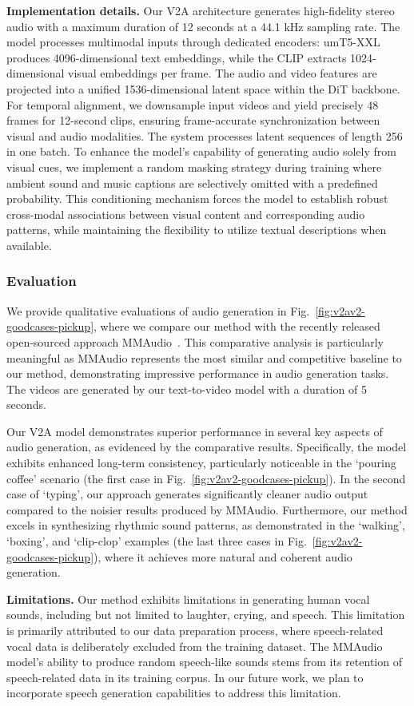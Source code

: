 \textbf{Implementation details.} Our V2A architecture generates high-fidelity stereo audio with a maximum duration of 12 seconds at a 44.1 kHz sampling rate. The model processes multimodal inputs through dedicated encoders: umT5-XXL produces 4096-dimensional text embeddings, while the CLIP extracts 1024-dimensional visual embeddings per frame. The audio and video features are projected into a unified 1536-dimensional latent space within the DiT backbone. For temporal alignment, we downsample input videos and yield precisely 48 frames for 12-second clips, ensuring frame-accurate synchronization between visual and audio modalities. The system processes latent sequences of length 256 in one batch. To enhance the model's capability of generating audio solely from visual cues, we implement a random masking strategy during training where ambient sound and music captions are selectively omitted with a predefined probability. This conditioning mechanism forces the model to establish robust cross-modal associations between visual content and corresponding audio patterns, while maintaining the flexibility to utilize textual descriptions when available.


\subsubsection{Evaluation}
We provide qualitative evaluations of audio generation in Fig.~\ref{fig:v2av2-goodcases-pickup}, where we compare our method with the recently released open-sourced approach MMAudio~\citep{mmaudio}. This comparative analysis is particularly meaningful as MMAudio represents the most similar and competitive baseline to our method, demonstrating impressive performance in audio generation tasks. The videos are generated by our text-to-video model with a duration of 5 seconds.

Our V2A model demonstrates superior performance in several key aspects of audio generation, as evidenced by the comparative results. Specifically, the model exhibits enhanced long-term consistency, particularly noticeable in the `pouring coffee' scenario (the first case in Fig.~\ref{fig:v2av2-goodcases-pickup}). In the second case of `typing', our approach generates significantly cleaner audio output compared to the noisier results produced by MMAudio. Furthermore, our method excels in synthesizing rhythmic sound patterns, as demonstrated in the `walking', `boxing', and `clip-clop' examples (the last three cases in Fig.~\ref{fig:v2av2-goodcases-pickup}), where it achieves more natural and coherent audio generation.

\textbf{Limitations.} Our method exhibits limitations in generating human vocal sounds, including but not limited to laughter, crying, and speech. This limitation is primarily attributed to our data preparation process, where speech-related vocal data is deliberately excluded from the training dataset. The MMAudio model's ability to produce random speech-like sounds stems from its retention of speech-related data in its training corpus. In our future work, we plan to incorporate speech generation capabilities to address this limitation.

